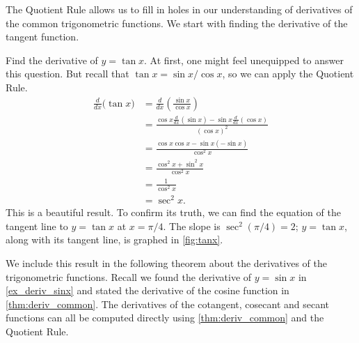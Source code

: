 The Quotient Rule allows us to fill in holes in our understanding of derivatives of the common trigonometric functions. We start with finding the derivative of the tangent function.

\begin{example}\label{ex_der_tan}
Find the derivative of $y=\tan x$.
\solution
At first, one might feel unequipped to answer this question. But recall that $\tan x = \sin x/\cos x$, so we can apply the Quotient Rule.
\begin{align*}
	\frac{d}{dx}\Big(\tan x\Big)
	&= \frac{d}{dx}\left(\frac{\sin x}{\cos x}\right) \\
	& = \frac{\cos x\frac{d}{dx}(\sin x)-\sin x\frac{d}{dx}(\cos x)}{(\cos x)^2} \\
	&= \frac{\cos x \cos x - \sin x (-\sin x)}{\cos^2 x} \\
	&= \frac{\cos^2x+\sin^2x}{\cos^2x}\\
	&= \frac{1}{\cos^2x} \\
	&= \sec ^2 x.
\end{align*}
This is a beautiful result. To confirm its truth, we can find the equation of the tangent line to $y=\tan x$ at $x=\pi/4$. The slope is $\sec^2(\pi/4) = 2$; $y=\tan x$, along with its tangent line, is graphed in \autoref{fig:tanx}.
\end{example}

We include this result in the following theorem about the derivatives of the trigonometric functions. Recall we found the derivative of $y=\sin x$ in \autoref{ex_deriv_sinx} and stated the derivative of the cosine function in \autoref{thm:deriv_common}. The derivatives of the cotangent, cosecant and secant functions can all be computed directly using \autoref{thm:deriv_common} and the Quotient Rule.


